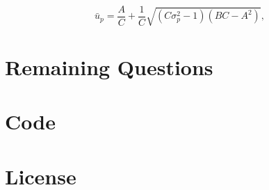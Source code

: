 \documentclass[a4paper]{article}
\begin{document}
\begin{equation*}
    \bar{u}_p = \frac{A}{C} + \frac{1}{C} \sqrt{(C\sigma^2_p - 1)(BC - A^2)},
\end{equation*}

\section{Remaining Questions}

\printbibliography

\appendix

\section{Code}

%

\section{License}

\doclicenseThis
\end{document}
